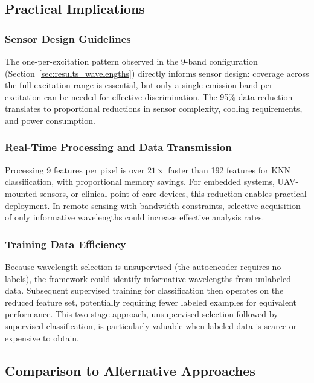 \subsection{Practical Implications}
\label{sec:discussion_practical}

\subsubsection{Sensor Design Guidelines}
The one-per-excitation pattern observed in the 9-band configuration (Section~\ref{sec:results_wavelengths}) directly informs sensor design: coverage across the full excitation range is essential, but only a single emission band per excitation can be needed for effective discrimination.
The 95\% data reduction translates to proportional reductions in sensor complexity, cooling requirements, and power consumption.

\subsubsection{Real-Time Processing and Data Transmission}
Processing 9 features per pixel is over $21\times$ faster than 192 features for KNN classification, with proportional memory savings.
For embedded systems, UAV-mounted sensors, or clinical point-of-care devices, this reduction enables practical deployment.
In remote sensing with bandwidth constraints, selective acquisition of only informative wavelengths could increase effective analysis rates.

\subsubsection{Training Data Efficiency}
Because wavelength selection is unsupervised (the autoencoder requires no labels), the framework could identify informative wavelengths from unlabeled data.
Subsequent supervised training for classification then operates on the reduced feature set, potentially requiring fewer labeled examples for equivalent performance.
This two-stage approach, unsupervised selection followed by supervised classification, is particularly valuable when labeled data is scarce or expensive to obtain.

\subsection{Comparison to Alternative Approaches}
\label{sec:discussion_alternatives}


